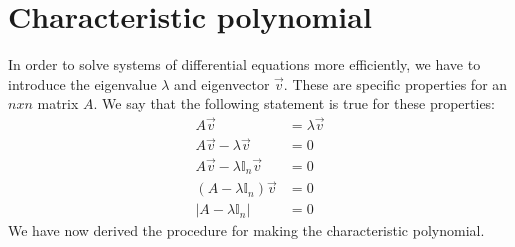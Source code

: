 \documentclass[]{subfiles}
\begin{document}
	\section{Characteristic polynomial}
	In order to solve systems of differential equations more efficiently, we have to introduce the eigenvalue $\lambda$ and eigenvector $\vec{v}$.  These are specific properties for an $n x n$ matrix $A$. We say that the following statement is true for these properties:
	\begin{align}
		A\vec{v}&=\lambda\vec{v}\\
		A\vec{v}-\lambda\vec{v}&=0\\
		A\vec{v}-\lambda\mathbb{I}_n\vec{v}&=0\\
		(A-\lambda\mathbb{I}_n)\vec{v}&=0\\
		|A-\lambda\mathbb{I}_n|&=0
	\end{align}
	We have now derived the procedure for making the characteristic polynomial.
\end{document}

